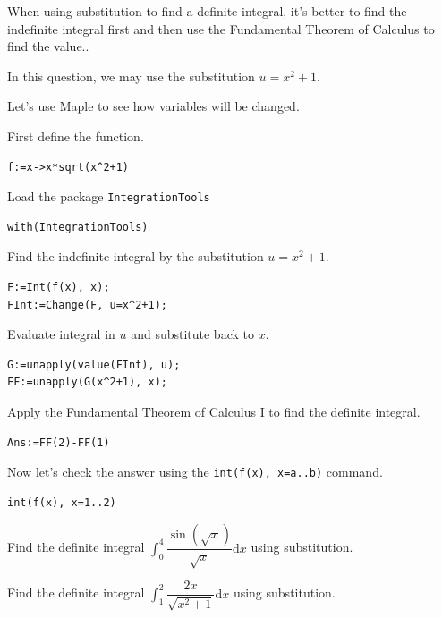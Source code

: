 \documentclass[]{book}
\theoremstyle{definition}
\theoremstyle{definition}
\theoremstyle{definition}
\theoremstyle{remark}
\let\BeginKnitrBlock\begin \let\EndKnitrBlock\end
\begin{document}
\BeginKnitrBlock{solution}
{}
When using substitution to find a definite integral, it's better to find the indefinite integral first and then use the Fundamental Theorem of Calculus to find the value..

In this question, we may use the substitution \(u=x^2+1\).

Let's use Maple to see how variables will be changed.

First define the function.

\begin{verbatim}
f:=x->x*sqrt(x^2+1)
\end{verbatim}

Load the package \texttt{IntegrationTools}

\begin{verbatim}
with(IntegrationTools)
\end{verbatim}

Find the indefinite integral by the substitution \(u=x^2+1\).

\begin{verbatim}
F:=Int(f(x), x);
FInt:=Change(F, u=x^2+1);
\end{verbatim}

Evaluate integral in \(u\) and substitute back to \(x\).

\begin{verbatim}
G:=unapply(value(FInt), u);
FF:=unapply(G(x^2+1), x);
\end{verbatim}

Apply the Fundamental Theorem of Calculus I to find the definite integral.

\begin{verbatim}
Ans:=FF(2)-FF(1)
\end{verbatim}

Now let's check the answer using the \texttt{int(f(x),\ x=a..b)} command.

\begin{verbatim}
int(f(x), x=1..2)
\end{verbatim}
\EndKnitrBlock{solution}

\BeginKnitrBlock{exercise}
\protect\hypertarget{exr:unnamed-chunk-150}{}{\label{exr:unnamed-chunk-150} }
Find the definite integral \(\displaystyle\int_0^{4} \dfrac{\sin(\sqrt{x})}{\sqrt{x}}\mathrm{d} x\) using substitution.
\EndKnitrBlock{exercise}

\BeginKnitrBlock{exercise}
\protect\hypertarget{exr:unnamed-chunk-151}{}{\label{exr:unnamed-chunk-151} }
Find the definite integral \(\displaystyle\int_1^{2} \dfrac{2x}{\sqrt{x^2+1}}\mathrm{d} x\) using substitution.
\EndKnitrBlock{exercise}
\end{document}
